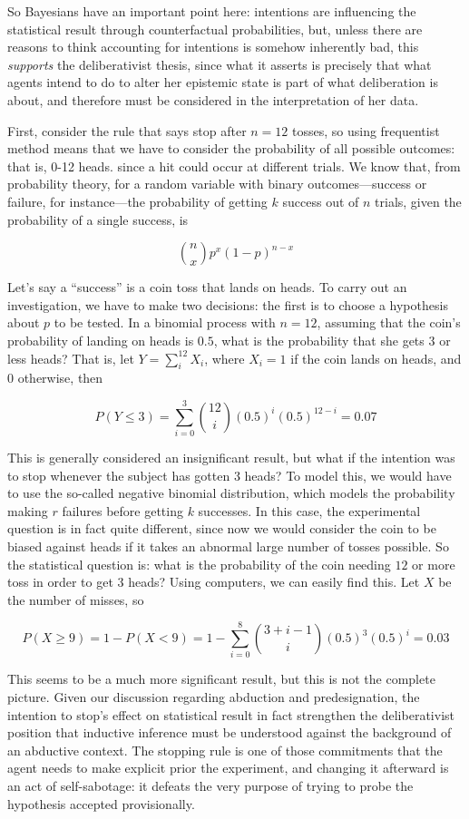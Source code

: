 So Bayesians have an important point here: intentions are influencing
the statistical result through counterfactual probabilities, but, unless
there are reasons to think accounting for intentions is somehow
inherently bad, this \emph{supports} the deliberativist thesis, since
what it asserts is precisely that what agents intend to do to alter her
epistemic state is part of what deliberation is about, and therefore
must be considered in the interpretation of her data.

First, consider the rule that says stop after \(n=12\) tosses, so using
frequentist method means that we have to consider the probability of all
possible outcomes: that is, 0-12 heads. since a hit could occur at
different trials. We know that, from probability theory, for a random
variable with binary outcomes---success or failure, for instance---the
probability of getting \(k\) success out of \(n\) trials, given the
probability of a single success, is

\[{n \choose x} p^x (1-p)^{n-x}\]

Let's say a ``success'' is a coin toss that lands on heads. To carry out
an investigation, we have to make two decisions: the first is to choose
a hypothesis about \(p\) to be tested. In a binomial process with
\(n=12\), assuming that the coin's probability of landing on heads is
\(0.5\), what is the probability that she gets 3 or less heads? That is,
let \(Y=\sum_i^{12} X_i\), where \(X_i = 1\) if the coin lands on heads,
and 0 otherwise, then

\[P(Y \leq 3 ) =  \sum_{i=0}^{3} {12 \choose i} (0.5)^i (0.5)^{12-i} = 0.07\]

This is generally considered an insignificant result, but what if the
intention was to stop whenever the subject has gotten 3 heads? To model
this, we would have to use the so-called negative binomial distribution,
which models the probability making \(r\) failures before getting \(k\)
successes. In this case, the experimental question is in fact quite
different, since now we would consider the coin to be biased against
heads if it takes an abnormal large number of tosses possible. So the
statistical question is: what is the probability of the coin needing
\(12\) or more toss in order to get 3 heads? Using computers, we can
easily find this. Let \(X\) be the number of misses, so

\[P(X \geq 9) = 1 - P(X <9) = 1 - \sum_{i=0}^{8} {3+i-1 \choose i} (0.5)^3 (0.5)^{i} =0.03\]

This seems to be a much more significant result, but this is not the
complete picture. Given our discussion regarding abduction and
predesignation, the intention to stop's effect on statistical result in
fact strengthen the deliberativist position that inductive inference
must be understood against the background of an abductive context. The
stopping rule is one of those commitments that the agent needs to make
explicit prior the experiment, and changing it afterward is an act of
self-sabotage: it defeats the very purpose of trying to probe the
hypothesis accepted provisionally.

